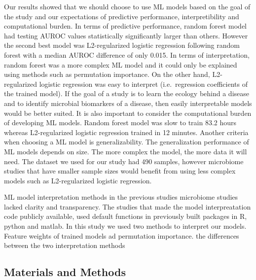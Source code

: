 \documentclass[11pt,]{article}
\begin{document}
Our results showed that we should choose to use ML models based on the
goal of the study and our expectations of predictive performance,
interpretibility and computational burden. In terms of predictive
performance, random forest model had testing AUROC values statistically
significantly larger than others. However the second best model was
L2-regularized logistic regression following random forest with a median
AUROC difference of only 0.015. In terms of interpretation, random
forest was a more complex ML model and it could only be explained using
methods such as permutation importance. On the other hand,
L2-regularized logistic regression was easy to interpret
(i.e.~regression coefficients of the trained model). If the goal of a
study is to learn the ecology behind a disease and to identify microbial
biomarkers of a disease, then easily interpretable models would be
better suited. It is also important to consider the computational burden
of developing ML models. Random forest model was slow to train 83.2
hours whereas L2-regularized logistic regression trained in 12 minutes.
Another criteria when choosing a ML model is generalizability. The
generalization performance of ML models depends on size. The more
complex the model, the more data it will need. The dataset we used for
our study had 490 samples, however microbiome studies that have smaller
sample sizes would benefit from using less complex models such as
L2-regularized logistic regression.

ML model interpretation methods in the previous studies microbiome
studies lacked clarity and transparency. The studies that made the model
interpreatation code publicly available, used default functions in
previously built packages in R, python and matlab. In this study we used
two methods to interpret our models. Feature weights of trained models
ad permutation importance. the differences between the two
interpretation methods

\subsection{Materials and Methods}\label{materials-and-methods}
\end{document}
